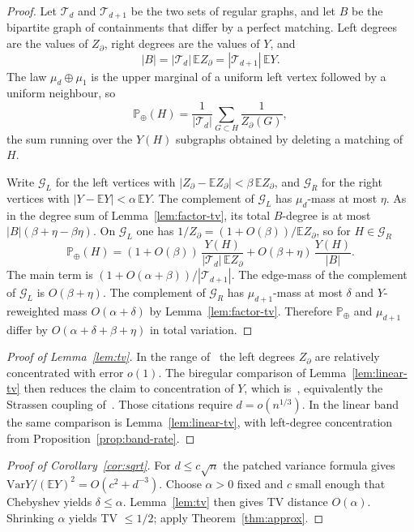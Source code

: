 \documentclass[11pt]{article}
\newcommand{\EE}{\mathbb{E}}
\newcommand{\PP}{\mathbb{P}}
\newcommand{\Var}{\mathrm{Var}}
\begin{document}
\begin{proof}
Let \(\mathcal{T}_d\) and \(\mathcal{T}_{d+1}\) be the two sets of regular graphs, and let \(B\) be the bipartite graph of containments that differ by a perfect matching.
Left degrees are the values of \(Z_\partial\), right degrees are the values of \(Y\), and
\[
|B|=|\mathcal{T}_d|\,\EE Z_\partial=|\mathcal{T}_{d+1}|\,\EE Y.
\]
The law \(\mu_d\oplus\mu_1\) is the upper marginal of a uniform left vertex followed by a uniform neighbour, so
\[
\PP_\oplus(H)=\frac1{|\mathcal{T}_d|}\sum_{G\subset H}\frac1{Z_\partial(G)},
\]
the sum running over the \(Y(H)\) subgraphs obtained by deleting a matching of \(H\).

Write \(\mathcal{G}_L\) for the left vertices with \(|Z_\partial-\EE Z_\partial|<\beta\,\EE Z_\partial\), and \(\mathcal{G}_R\) for the right vertices with \(|Y-\EE Y|<\alpha\,\EE Y\).
The complement of \(\mathcal{G}_L\) has \(\mu_d\)-mass at most \(\eta\). As in the degree sum of Lemma~\ref{lem:factor-tv}, its total \(B\)-degree is at most \(|B|(\beta+\eta-\beta\eta)\).
On \(\mathcal{G}_L\) one has \(1/Z_\partial=(1+O(\beta))/\EE Z_\partial\), so for \(H\in\mathcal{G}_R\)
\[
\PP_\oplus(H)
=
(1+O(\beta))\,\frac{Y(H)}{|\mathcal{T}_d|\,\EE Z_\partial}
+
O(\beta+\eta)\,\frac{Y(H)}{|B|}.
\]
The main term is \((1+O(\alpha+\beta))/|\mathcal{T}_{d+1}|\).
The edge-mass of the complement of \(\mathcal{G}_L\) is \(O(\beta+\eta)\).
The complement of \(\mathcal{G}_R\) has \(\mu_{d+1}\)-mass at most \(\delta\) and \(Y\)-reweighted mass \(O(\alpha+\delta)\) by Lemma~\ref{lem:factor-tv}.
Therefore \(\PP_\oplus\) and \(\mu_{d+1}\) differ by \(O(\alpha+\delta+\beta+\eta)\) in total variation.
\end{proof}

\begin{proof}[Proof of Lemma~\ref{lem:tv}]
In the range of~\cite[Theorem~14]{Gao21} the left degrees \(Z_\partial\) are relatively concentrated with error \(o(1)\).
The biregular comparison of Lemma~\ref{lem:linear-tv} then reduces the claim to concentration of \(Y\), which is~\cite[Theorem~19]{Gao21}, equivalently the Strassen coupling of~\cite[Corollary~3.2]{HLMPW25}.
Those citations require \(d=o(n^{1/3})\). In the linear band the same comparison is Lemma~\ref{lem:linear-tv}, with left-degree concentration from Proposition~\ref{prop:band-rate}.
\end{proof}

\begin{proof}[Proof of Corollary~\ref{cor:sqrt}]
For \(d\le c\sqrt{n}\) the patched variance formula gives
\(\Var Y/(\EE Y)^2=O(c^2+d^{-3})\).
Choose \(\alpha>0\) fixed and \(c\) small enough that Chebyshev yields \(\delta\le\alpha\).
Lemma~\ref{lem:tv} then gives TV distance \(O(\alpha)\).
Shrinking \(\alpha\) yields TV \(\le 1/2\); apply Theorem~\ref{thm:approx}.
\end{proof}
\end{document}
